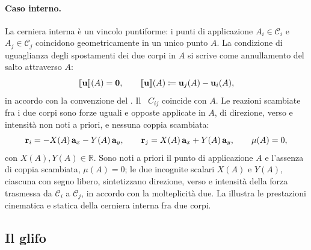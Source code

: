 \paragraph{Caso interno.}
La cerniera interna è un vincolo puntiforme: i punti di
applicazione $A_i \in \mathcal{C}_i$ e $A_j \in \mathcal{C}_j$
coincidono geometricamente in un unico punto $A$. La
condizione di uguaglianza degli spostamenti dei due corpi in
$A$ si scrive come annullamento del salto attraverso $A$:
\begin{equation}\label{eq:cerniera_int}
	\llbracket \mathbf{u} \rrbracket(A) = \mathbf{0},
	\qquad
	\llbracket \mathbf{u} \rrbracket(A) \coloneqq \mathbf{u}_j(A) - \mathbf{u}_i(A),
\end{equation}
in accordo con la convenzione del
. Il \CRr\ $C_{ij}$ coincide
con $A$. Le reazioni scambiate fra i due corpi sono forze
uguali e opposte applicate in $A$, di direzione, verso e
intensità non noti a priori, e nessuna coppia scambiata:
\begin{equation}\label{eq:reazione_cerniera_int}
	\mathbf{r}_i = -X(A)\,\mathbf{a}_x - Y(A)\,\mathbf{a}_y,
	\qquad
	\mathbf{r}_j = X(A)\,\mathbf{a}_x + Y(A)\,\mathbf{a}_y,
	\qquad
	\mu(A) = 0,
\end{equation}
con $X(A), Y(A) \in \mathbb{R}$. Sono noti a priori il punto
di applicazione $A$ e l'assenza di coppia scambiata,
$\mu(A) = 0$; le due incognite scalari $X(A)$ e $Y(A)$,
ciascuna con segno libero, sintetizzano direzione, verso e
intensità della forza trasmessa da $\mathcal{C}_i$ a
$\mathcal{C}_j$, in accordo con la molteplicità due. La
 illustra le prestazioni
cinematica e statica della cerniera interna fra due corpi.








\subsection{Il glifo}\label{sec:glifo}

